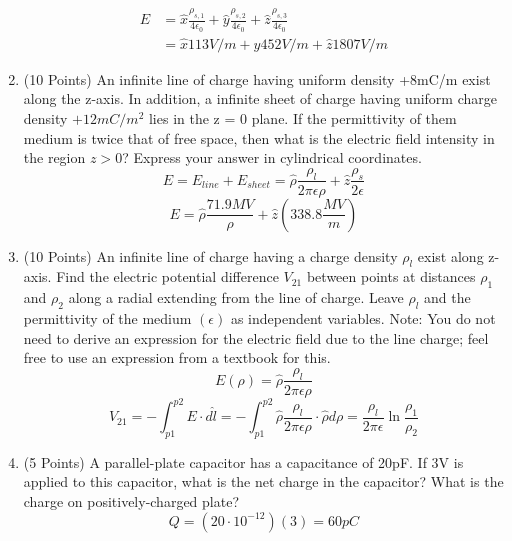 \documentclass{article}
\begin{document}
\begin{enumerate}
    \begin{align}
        E &= \hat{x}\frac{\rho_{s,1}}{4\epsilon_0} + \hat{y}\frac{\rho_{s,2}}{4\epsilon_0} + \hat{z}\frac{\rho_{s,3}}{4\epsilon_0}\\
        &= \boxed{\hat{x}113V/m + \hat{y}452V/m + \hat{z}1807V/m}
    \end{align}
    \newpage
    \item (10 Points) An infinite line of charge having uniform density +8mC/m exist along the z-axis. In addition, a infinite sheet of charge having uniform charge density $+12mC/m^2$ lies in the z = 0 plane. If the permittivity of them medium is twice that of free space, then what is the electric field intensity in the region $z > 0$? Express your answer in cylindrical coordinates.
    \begin{equation}
        E = E_{line} + E_{sheet} = \hat{\rho}\frac{\rho_l}{2\pi\epsilon\rho}+\hat{z}\frac{\rho_s}{2\epsilon}
    \end{equation}
    \begin{equation}
        E = \boxed{\hat{\rho}\frac{71.9MV}{\rho} + \hat{z}(338.8\frac{MV}{m})}
    \end{equation}
    \newpage
    \item (10 Points) An infinite line of charge having a charge density $\rho_l$ exist along  z-axis. Find the electric potential difference $V_{21}$ between points at distances $\rho_1$ and $\rho_2$ along a radial extending from the line of charge. Leave $\rho_l$ and the permittivity of the medium $(\epsilon)$ as independent variables. Note: You do not need to derive an expression for the electric field due to the line charge; feel free to use an expression from a textbook for this.
    \begin{equation}
        E(\rho) = \hat{\rho}\frac{\rho_l}{2\pi\epsilon\rho}
    \end{equation}
    \begin{equation}
        V_{21} = -\int_{p1}^{p2}E\cdot d\hat{l} = -\int_{p1}^{p2} \hat{\rho}\frac{\rho_l}{2\pi\epsilon\rho}\cdot\hat{\rho}d\rho = \boxed{\frac{\rho_l}{2\pi\epsilon}\ln\frac{\rho_1}{\rho_2}}
    \end{equation}
    \newpage
    \item (5 Points) A parallel-plate capacitor has a capacitance of 20pF. If 3V is applied to this capacitor, what is the net charge in the capacitor? What is the charge on positively-charged plate?
    \begin{equation}
        Q = (20\cdot10^{-12})(3) = \boxed{60pC}

\end{equation}
\end{enumerate}
\end{document}
